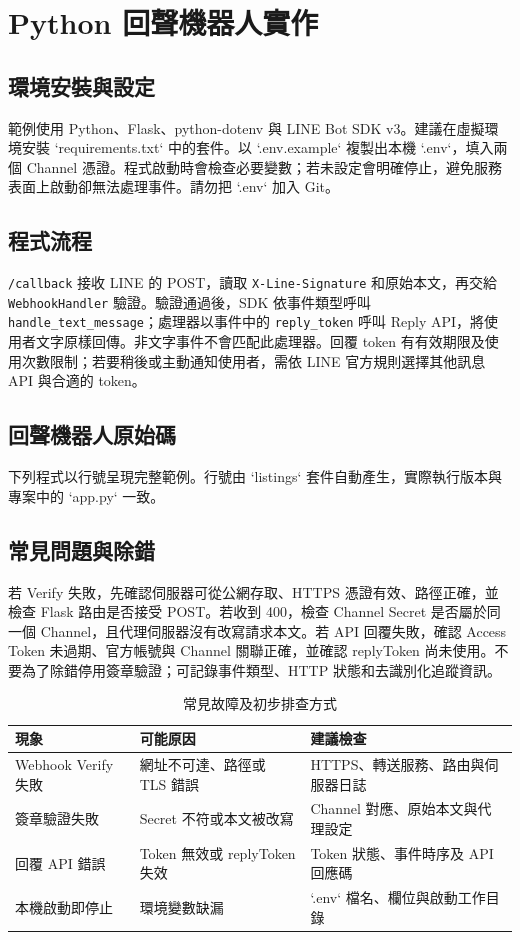 \documentclass[12pt,a4paper,openany]{book}
\begin{document}
\chapter{Python 回聲機器人實作}
\section{環境安裝與設定}
範例使用 Python、Flask、python-dotenv 與 LINE Bot SDK v3。建議在虛擬環境安裝 `requirements.txt` 中的套件。以 `.env.example` 複製出本機 `.env`，填入兩個 Channel 憑證。程式啟動時會檢查必要變數；若未設定會明確停止，避免服務表面上啟動卻無法處理事件。請勿把 `.env` 加入 Git。

\section{程式流程}
\texttt{/callback} 接收 LINE 的 POST，讀取 \texttt{X-Line-Signature} 和原始本文，再交給 \texttt{WebhookHandler} 驗證。驗證通過後，SDK 依事件類型呼叫 \texttt{handle\_text\_message}；處理器以事件中的 \texttt{reply\_token} 呼叫 Reply API，將使用者文字原樣回傳。非文字事件不會匹配此處理器。回覆 token 有有效期限及使用次數限制；若要稍後或主動通知使用者，需依 LINE 官方規則選擇其他訊息 API 與合適的 token。

\section{回聲機器人原始碼}
下列程式以行號呈現完整範例。行號由 `listings` 套件自動產生，實際執行版本與專案中的 `app.py` 一致。


\section{常見問題與除錯}
若 Verify 失敗，先確認伺服器可從公網存取、HTTPS 憑證有效、路徑正確，並檢查 Flask 路由是否接受 POST。若收到 400，檢查 Channel Secret 是否屬於同一個 Channel，且代理伺服器沒有改寫請求本文。若 API 回覆失敗，確認 Access Token 未過期、官方帳號與 Channel 關聯正確，並確認 replyToken 尚未使用。不要為了除錯停用簽章驗證；可記錄事件類型、HTTP 狀態和去識別化追蹤資訊。

\begin{table}[htbp]
\centering
\caption{常見故障及初步排查方式}
\label{tab:troubleshoot}
\begin{tabularx}{\textwidth}{>{\raggedright\arraybackslash}p{3.1cm}XX}
\toprule
現象 & 可能原因 & 建議檢查 \\
\midrule
Webhook Verify 失敗 & 網址不可達、路徑或 TLS 錯誤 & HTTPS、轉送服務、路由與伺服器日誌 \\
簽章驗證失敗 & Secret 不符或本文被改寫 & Channel 對應、原始本文與代理設定 \\
回覆 API 錯誤 & Token 無效或 replyToken 失效 & Token 狀態、事件時序及 API 回應碼 \\
本機啟動即停止 & 環境變數缺漏 & `.env` 檔名、欄位與啟動工作目錄 \\
\bottomrule
\end{tabularx}
\end{table}
\end{document}
